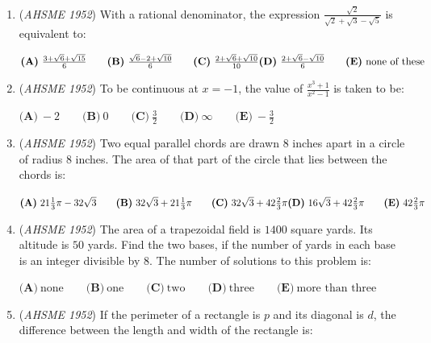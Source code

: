 \begin{enumerate}
 $\textbf{(A)}\ \frac{1-p^2}{200}\qquad \textbf{(B)}\ \frac{\sqrt{1-p^2}}{100}\qquad \textbf{(C)}\ \text{one dollar}\qquad\\ \textbf{(D)}\ 1-\frac{p^2}{10000-p^2}\qquad \textbf{(E)}\ \frac{10000}{10000-p^2}$


	\item (\textit{AHSME 1952}) With a rational denominator, the expression $\frac {\sqrt {2}}{\sqrt {2} + \sqrt {3} - \sqrt {5}}$ is equivalent to: 


 $\textbf{(A)}\ \frac {3 + \sqrt {6} + \sqrt {15}}{6} \qquad \textbf{(B)}\ \frac {\sqrt {6} - 2 + \sqrt {10}}{6} \qquad \textbf{(C)}\ \frac{2+\sqrt{6}+\sqrt{10}}{10} \qquad\\ \textbf{(D)}\ \frac {2 + \sqrt {6} - \sqrt {10}}{6} \qquad \textbf{(E)}\ \text{none of these}$


	\item (\textit{AHSME 1952}) To be continuous at $x = - 1$, the value of $\frac {x^3 + 1}{x^2 - 1}$ is taken to be: 


 $\textbf{(A)}\ - 2 \qquad \textbf{(B)}\ 0 \qquad \textbf{(C)}\ \frac {3}{2} \qquad \textbf{(D)}\ \infty \qquad \textbf{(E)}\ -\frac{3}{2}$


	\item (\textit{AHSME 1952}) Two equal parallel chords are drawn $8$ inches apart in a circle of radius $8$ inches. The area of that part of the circle that lies between the chords is:


 $\textbf{(A)}\ 21\frac{1}{3}\pi-32\sqrt{3}\qquad \textbf{(B)}\ 32\sqrt{3}+21\frac{1}{3}\pi\qquad \textbf{(C)}\ 32\sqrt{3}+42\frac{2}{3}\pi \qquad\\ \textbf{(D)}\ 16\sqrt {3} + 42\frac {2}{3}\pi \qquad \textbf{(E)}\ 42\frac {2}{3}\pi$


	\item (\textit{AHSME 1952}) The area of a trapezoidal field is $1400$ square yards. Its altitude is $50$ yards. Find the two bases, if the number of yards in each base is an integer divisible by $8$. The number of solutions to this problem is: 


 $\textbf{(A)}\ \text{none} \qquad \textbf{(B)}\ \text{one} \qquad \textbf{(C)}\ \text{two} \qquad \textbf{(D)}\ \text{three} \qquad \textbf{(E)}\ \text{more than three}$


	\item (\textit{AHSME 1952}) If the perimeter of a rectangle is $p$ and its diagonal is $d$, the difference between the length and width of the rectangle is: 



\end{enumerate}

